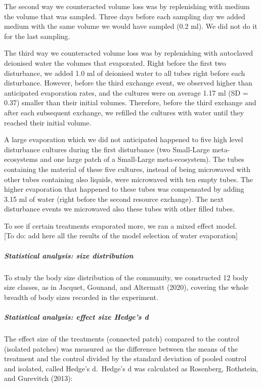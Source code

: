 \documentclass[
]{article}
\begin{document}
The second way we counteracted volume loss was by replenishing with
medium the volume that was sampled. Three days before each sampling day
we added medium with the same volume we would have sampled (0.2 ml). We
did not do it for the last sampling.

The third way we counteracted volume loss was by replenishing with
autoclaved deionised water the volumes that evaporated. Right before the
first two disturbance, we added 1.0 ml of deionised water to all tubes
right before each disturbance. However, before the third exchange event,
we observed higher than anticipated evaporation rates, and the cultures
were on average 1.17 ml (SD = 0.37) smaller than their initial volumes.
Therefore, before the third exchange and after each subsequent exchange,
we refilled the cultures with water until they reached their initial
volume.

A large evaporation which we did not anticipated happened to five high
level disturbance cultures during the first disturbance (two Small-Large
meta-ecosystems and one large patch of a Small-Large meta-ecosystem).
The tubes containing the material of these five cultures, instead of
being microwaved with other tubes containing also liquids, were
microwaved with ten empty tubes. The higher evaporation that happened to
these tubes was compensated by adding 3.15 ml of water (right before the
second resource exchange). The next disturbance events we microwaved
also these tubes with other filled tubes.

To see if certain treatments evaporated more, we ran a mixed effect
model.\\
{[}To do: add here all the results of the model selection of water
evaporation{]}

\hypertarget{statistical-analysis-size-distribution}{%
\subparagraph{Statistical analysis: size
distribution}\label{statistical-analysis-size-distribution}}

To study the body size distribution of the community, we constructed 12
body size classes, as in Jacquet, Gounand, and Altermatt (2020),
covering the whole breadth of body sizes recorded in the experiment.

\hypertarget{statistical-analysis-effect-size-hedges-d}{%
\subparagraph{Statistical analysis: effect size Hedge's
d}\label{statistical-analysis-effect-size-hedges-d}}

The effect size of the treatments (connected patch) compared to the
control (isolated patches) was measured as the difference between the
means of the treatment and the control divided by the standard deviation
of pooled control and isolated, called Hedge's d.~Hedge's d was
calculated as Rosenberg, Rothstein, and Gurevitch (2013):
\end{document}
